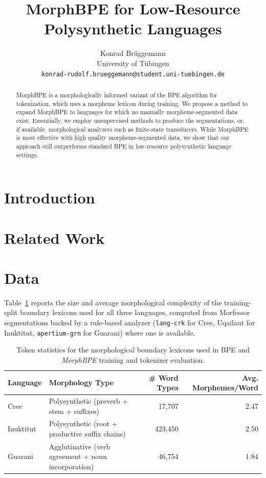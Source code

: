 \documentclass[11pt]{article}
\title{MorphBPE for Low-Resource Polysynthetic Languages}
\author{Konrad Brüggemann \\
  University of Tübingen\\
  \texttt{konrad-rudolf.brueggemann@student.uni-tuebingen.de}}
\begin{document}
\maketitle

\begin{abstract}
MorphBPE is a morphologically informed variant of the BPE algorithm for tokenization, which uses a morpheme lexicon during training. We propose a method to expand MorphBPE to languages for which no manually morpheme-segmented data exist. Essentially, we employ unsupervised methods to produce the segmentations, or, if available, morphological analyzers such as finite-state transducers. While MorphBPE is most effective with high quality morpheme-segmented data, we show that our approach still outperforms standard BPE in low-resource polysynthetic language settings.
\end{abstract}

\section{Introduction}

\section{Related Work}

\section{Data}

Table~\ref{tab:token-stats} reports the size and average morphological complexity of the training-split boundary lexicons used for all three languages, computed from Morfessor segmentations backed by a rule-based analyzer (\texttt{lang-crk} for Cree, Uqailaut for Inuktitut, \texttt{apertium-grn} for Guarani) where one is available.

\begin{table}[t]
\centering
\begin{tabular}{llrr}
\toprule
Language & Morphology Type & \# Word Types & Avg. Morphemes/Word \\
\midrule
Cree      & Polysynthetic (preverb + stem + suffixes)          & 17{,}707  & 2.47 \\
Inuktitut & Polysynthetic (root + productive suffix chains)    & 423{,}450 & 2.50 \\
Guarani   & Agglutinative (verb agreement + noun incorporation) & 46{,}754  & 1.84 \\
\bottomrule
\end{tabular}
\caption{Token statistics for the morphological boundary lexicons used in BPE and \textit{MorphBPE} training and tokenizer evaluation.}
\label{tab:token-stats}
\end{table}
\end{document}
